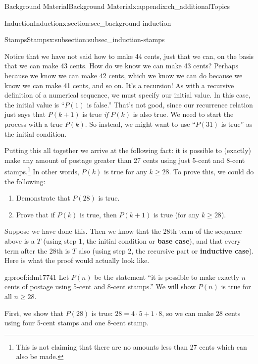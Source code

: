 \documentclass[oneside,10pt,]{book}
\newcommand{\terminology}[1]{\textbf{#1}}
\numberwithin{equation}{chapter}
\begin{document}
\begin{appendixptx}{Background Material}{}{Background Material}{}{}{x:appendix:ch_additionalTopics}
\begin{sectionptx}{Induction}{}{Induction}{}{}{x:section:sec_background-induction}
\begin{subsectionptx}{Stamps}{}{Stamps}{}{}{x:subsection:subsec_induction-stamps}
\par
Notice that we have not said how to make 44 cents, just that we can, on the basis that we can make 43 cents. How do we know we can make 43 cents? Perhaps because we know we can make \(42\)\label{g:notation:idm17712} cents, which we know we can do because we know we can make 41 cents, and so on. It's a recursion! As with a recursive definition of a numerical sequence, we must specify our initial value. In this case, the initial value is ``\(P(1)\) is false.'' That's not good, since our recurrence relation just says that \(P(k+1)\) is true \emph{if} \(P(k)\) is also true. We need to start the process with a true \(P(k)\). So instead, we might want to use ``\(P(31)\) is true'' as the initial condition.%
\par
Putting this all together we arrive at the following fact: it is possible to (exactly) make any amount of postage greater than 27 cents using just 5-cent and 8-cent stamps.\footnote{This is not claiming that there are no amounts less than 27 cents which can also be made.\label{g:fn:idm17724}} In other words, \(P(k)\) is true for any \(k \ge 28\). To prove this, we could do the following:%
\begin{enumerate}
\item{}Demonstrate that \(P(28)\) is true.%
\item{}Prove that if \(P(k)\) is true, then \(P(k+1)\) is true (for any \(k \ge 28\)).%
\end{enumerate}
%
\par
Suppose we have done this. Then we know that the 28th term of the sequence above is a \(T\) (using step 1, the initial condition or \terminology{base case}), and that every term after the 28th is \(T\) also (using step 2, the recursive part or \terminology{inductive case}). Here is what the proof would actually look like.%
\begin{proofptx}{}{g:proof:idm17741}
Let \(P(n)\) be the statement ``it is possible to make exactly \(n\) cents of postage using 5-cent and 8-cent stamps.'' We will show \(P(n)\) is true for all \(n \ge 28\).%
\par
First, we show that \(P(28)\) is true: \(28 =  4 \cdot 5+ 1\cdot 8\), so we can make \(28\) cents using four 5-cent stamps and one 8-cent stamp.%
\par

\end{proofptx}
\end{subsectionptx}
\end{sectionptx}
\end{appendixptx}
\end{document}
